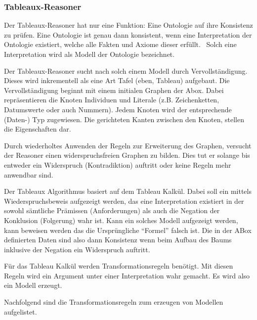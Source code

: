 \subsubsection{Tableaux-Reasoner}
\label{ssubsection:inferenz_pellet_tableaux}
Der Tableaux-Reasoner hat nur eine Funktion: Eine Ontologie auf ihre Konsistenz zu prüfen. Eine Ontologie ist genau dann konsistent, wenn eine Interpretation der Ontologie existiert, welche alle Fakten und Axiome dieser erfüllt.~\cite{w3owlsemantics} Solch eine Interpretation wird als Modell der Ontologie bezeichnet.

Der Tableaux-Reasoner sucht nach solch einem Modell durch Vervollständigung. Dieses wird inkrementell als eine Art Tafel (eben, Tableau) aufgebaut. Die Vervollständigung beginnt mit einem initialen Graphen der Abox. Dabei repräsentieren die Knoten Individuen und Literale (z.B. Zeichenketten, Datumswerte oder auch Nummern). Jedem Knoten wird der entsprechende (Daten-) Typ zugewiesen. Die gerichteten Kanten zwischen den Knoten, stellen die Eigenschaften dar. %


Durch wiederholtes Anwenden der Regeln zur Erweiterung des Graphen, versucht der Reasoner einen widerspruchsfreien Graphen zu bilden. Dies tut er solange bis entweder ein Widerspruch (Kontradiktion) auftritt oder keine Regeln mehr anwendbar sind.

Der Tableaux Algorithmus basiert auf dem Tableau Kalkül. Dabei soll ein mittels Wiederspruchsbeweis aufgezeigt werden, das eine Interpretation existiert in der sowohl sämtliche Prämissen (Anforderungen) als auch die Negation der Konklusion (Folgerung) wahr ist. Kann ein solches Modell aufgezeigt werden, kann beweisen werden das die Ursprüngliche "`Formel"' falsch ist. Die in der ABox definierten Daten sind also dann Konsistenz wenn beim Aufbau des Baums inklusive der Negation ein Widerspruch auftritt.~\cite{baumkalkül}

Für das Tableau Kalkül werden Transformationsregeln benötigt. Mit diesen Regeln wird ein Argument unter einer Interpretation wahr gemacht. Es wird also ein Modell erzeugt.\cite{baumkalkül}

Nachfolgend sind die Transformationsregeln zum erzeugen von Modellen aufgelistet.

